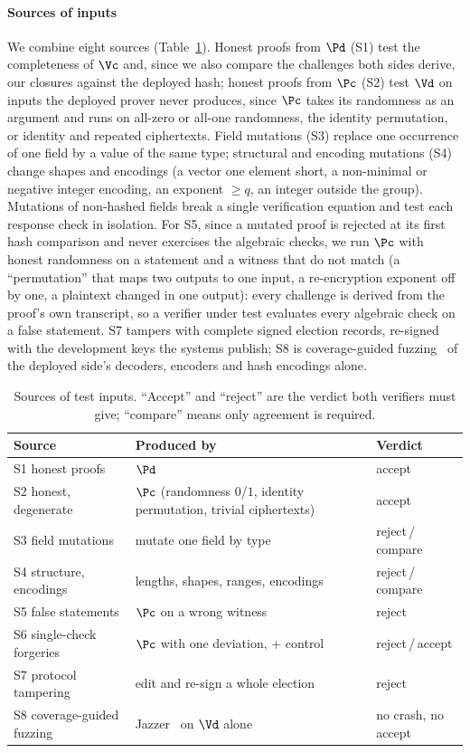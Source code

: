 \paragraph{Sources of inputs}
We combine eight sources (Table~\ref{tab:sources}). Honest proofs from
$\Pd$ (S1) test the completeness of $\Vc$ and, since we also compare the
challenges both sides derive, our closures against the deployed hash;
honest proofs from $\Pc$ (S2) test $\Vd$ on inputs the deployed prover
never produces, since $\Pc$ takes its randomness as an argument and runs
on all-zero or all-one randomness, the identity permutation, or identity
and repeated ciphertexts. Field mutations (S3) replace one occurrence of
one field by a value of the same type; structural and encoding mutations
(S4) change shapes and encodings (a vector one element short, a
non-minimal or negative integer encoding, an exponent $\ge q$, an integer
outside the group). Mutations of non-hashed fields break a single
verification equation and test each response check in isolation. For
S5, since a mutated proof is rejected at its first hash comparison and
never exercises the algebraic checks, we run $\Pc$ with honest randomness
on a statement and a witness that do not match (a ``permutation'' that
maps two outputs to one input, a re-encryption exponent off by one, a
plaintext changed in one output): every challenge is derived from the
proof's own transcript, so a verifier under test evaluates every
algebraic check on a false statement. S7 tampers with complete signed
election records, re-signed with the development keys the systems
publish; S8 is coverage-guided fuzzing~\cite{jazzer} of the deployed
side's decoders, encoders and hash encodings alone.

\begin{table}[t]
  \caption{Sources of test inputs. ``Accept'' and ``reject'' are the verdict
  both verifiers must give; ``compare'' means only agreement is required.}
  \label{tab:sources}
  \centering\footnotesize
  \begin{tabularx}{\columnwidth}{@{}l>{\raggedright\arraybackslash}Xl@{}}
    \toprule
    Source & Produced by & Verdict \\
    \midrule
    S1 honest proofs & $\Pd$ & accept \\
    S2 honest, degenerate & $\Pc$ (randomness $0$/$1$, identity permutation, trivial ciphertexts) & accept \\
    S3 field mutations & mutate one field by type & reject\,/\,compare \\
    S4 structure, encodings & lengths, shapes, ranges, encodings & reject\,/\,compare \\
    S5 false statements & $\Pc$ on a wrong witness & reject \\
    S6 single-check forgeries & $\Pc$ with one deviation, + control & reject\,/\,accept \\
    S7 protocol tampering & edit and re-sign a whole election & reject \\
    S8 coverage-guided fuzzing & Jazzer~\cite{jazzer} on $\Vd$ alone & no crash, no accept \\
    \bottomrule
  \end{tabularx}
\end{table}

